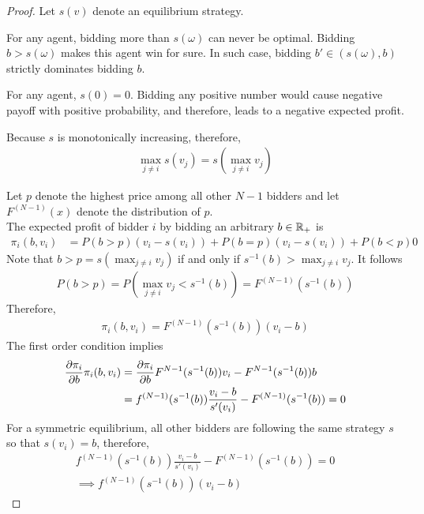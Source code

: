\documentclass{article}
\begin{document}
	\begin{proof}
		Let $s(v)$ denote an equilibrium strategy.
		\begin{lemma}
			For any agent, bidding more than $s(\omega)$ can never be optimal. Bidding $b > s(\omega)$ makes this agent win for sure. In such case, bidding $b' \in (s(\omega), b)$ strictly dominates bidding $b$.
		\end{lemma}
		\begin{lemma}
			For any agent, $s(0) = 0$. Bidding any positive number would cause negative payoff with positive probability, and therefore, leads to a negative expected profit.
		\end{lemma}
		\begin{lemma}
			Because $s$ is monotonically increasing, therefore,
			\begin{align}
				\max_{j \neq i} s(v_j) = s(\max_{j \neq i} v_j)
			\end{align}
		\end{lemma}
		Let $p$ denote the highest price among all other $N-1$ bidders and let $F^{(N-1)}(x)$ denote the distribution of $p$. \\
		The expected profit of bidder $i$ by bidding an arbitrary $b \in \mathbb{R}_+$ is
		\begin{align}
			\pi_i(b, v_i) &= P(b > p) (v_i - s(v_i))
			+ P(b = p) (v_i - s(v_i))
			+ P(b < p) 0
		\end{align}
		Note that $b > p = s(\max_{j \neq i}v_j)$ if and only if $s^{-1}(b) > \max_{j \neq i}v_j$. It follows
		\begin{align}
			P(b > p) = P(\max_{j \neq i}v_j < s^{-1}(b)) = F^{(N-1)}(s^{-1}(b))
		\end{align}
		Therefore,
		\begin{align}
			\pi_i(b, v_i) = F^{(N-1)}(s^{-1}(b)) (v_i - b)
		\end{align}
		The first order condition implies
		\begin{align}
			\frac{\partial{\pi_i}}{\partial{b}} \pi_i (b, v_i) 
			&= \frac{\partial{\pi_i}}{\partial{b}} F^{N-1} (s^{-1}(b)) v_i - F^{N-1} (s^{-1}(b)) b \\
			&= f^{(N-1)}(s^{-1}(b)) \frac{v_i - b}{s'(v_i)}
			- F^{(N-1)}(s^{-1}(b)) = 0
		\end{align}
		For a symmetric equilibrium, all other bidders are following the same strategy $s$ so that $s(v_i) = b$, therefore, 
		\begin{align}
			f^{(N-1)}(s^{-1}(b)) \frac{v_i - b}{s'(v_i)}
			- F^{(N-1)}(s^{-1}(b)) = 0 \\
			\implies f^{(N-1)}(s^{-1}(b)) (v_i - b)

\end{align}
\end{proof}
\end{document}
